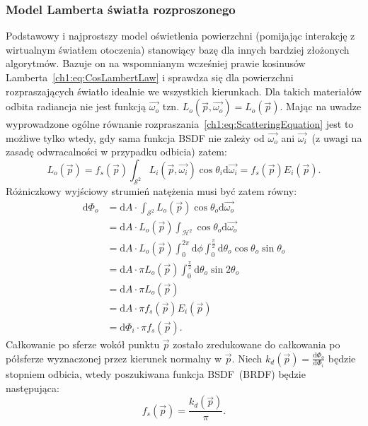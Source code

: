 \subsubsection{Model Lamberta światła rozproszonego}
Podstawowy i najprostszy model oświetlenia powierzchni (pomijając interakcję z wirtualnym światłem otoczenia) stanowiący bazę dla innych bardziej złożonych algorytmów. Bazuje on na wspomnianym wcześniej prawie kosinusów Lamberta~\eqref{ch1:eq:CosLambertLaw} i sprawdza się dla powierzchni rozpraszających światło idealnie we wszystkich kierunkach. Dla takich materiałów odbita radiancja nie jest funkcją $\vec{\omega_o}$ tzn. $L_o(\vec{p}, \vec{\omega_o}) = L_o(\vec{p})$. Mając na uwadze wyprowadzone ogólne równanie rozpraszania~\eqref{ch1:eq:ScatteringEquation} jest to możliwe tylko wtedy, gdy sama funkcja BSDF nie zależy od $\vec{\omega_o}$ ani $\vec{\omega_i}$~(z uwagi na zasadę odwracalności w przypadku odbicia) zatem:
\begin{equation}
L_o(\vec{p}) = f_s(\vec{p})\int_{\mathcal{S}^2}L_i(\vec{p}, \vec{\omega_i})\cos\theta_i\mathrm{d}\vec{\omega_i}= f_s(\vec{p})E_i(\vec{p}).
\end{equation}
Różniczkowy wyjściowy strumień natężenia musi być zatem równy:
\begin{align}
\mathrm{d}\Phi_o &= \mathrm{d}A\cdot\int_{\mathcal{S}^2}L_o(\vec{p})\cos\theta_o\mathrm{d}\vec{\omega_o}\nonumber\\
&= \mathrm{d}A\cdot L_o(\vec{p})\int_{\mathcal{H}^2}\cos\theta_o\mathrm{d}\vec{\omega_o}\nonumber\\
&= \mathrm{d}A\cdot L_o(\vec{p})\int_0^{2\pi}\mathrm{d}\phi\int_0^{\frac{\pi}{2}}\mathrm{d}\theta_o\cos\theta_o\sin\theta_o\nonumber\\
&= \mathrm{d}A\cdot\pi L_o(\vec{p})\int_0^{\frac{\pi}{2}}\mathrm{d}\theta_o\sin 2\theta_o \nonumber\\
&= \mathrm{d}A\cdot\pi L_o(\vec{p})\nonumber\\
&= \mathrm{d}A\cdot\pi f_s(\vec{p})E_i(\vec{p})\nonumber\\
&= \mathrm{d}\Phi_i\cdot\pi f_s(\vec{p}).
\end{align}
Całkowanie po sferze wokół punktu $\vec{p}$ zostało zredukowane do całkowania po półsferze wyznaczonej przez kierunek normalny w $\vec{p}$. Niech $k_d(\vec{p}) = \frac{\mathrm{d}\Phi_o}{\mathrm{d}\Phi_i}$ będzie stopniem odbicia, wtedy poszukiwana funkcja BSDF~(BRDF) będzie następująca:
\begin{equation}
f_s(\vec{p}) = \frac{k_d(\vec{p})}{\pi}.
\label{ch1:eq:LambertBRDF}
\end{equation}

